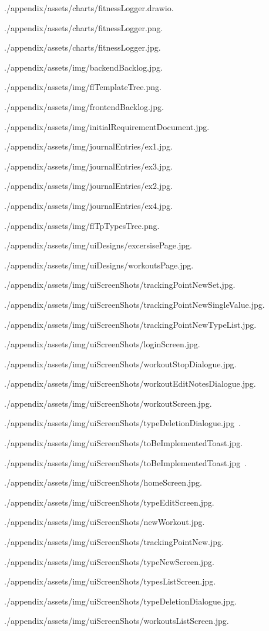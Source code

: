 \item ./appendix/assets/charts/fitnessLogger.drawio.  
\item ./appendix/assets/charts/fitnessLogger.png.  
\item ./appendix/assets/charts/fitnessLogger.jpg.  
\item ./appendix/assets/img/backendBacklog.jpg.  
\item ./appendix/assets/img/flTemplateTree.png.  
\item ./appendix/assets/img/frontendBacklog.jpg.  
\item ./appendix/assets/img/initialRequirementDocument.jpg.  
\item ./appendix/assets/img/journalEntries/ex1.jpg.  
\item ./appendix/assets/img/journalEntries/ex3.jpg.  
\item ./appendix/assets/img/journalEntries/ex2.jpg.  
\item ./appendix/assets/img/journalEntries/ex4.jpg.  
\item ./appendix/assets/img/flTpTypesTree.png.  
\item ./appendix/assets/img/uiDesigns/excersisePage.jpg.  
\item ./appendix/assets/img/uiDesigns/workoutsPage.jpg.  
\item ./appendix/assets/img/uiScreenShots/trackingPointNewSet.jpg.  
\item ./appendix/assets/img/uiScreenShots/trackingPointNewSingleValue.jpg.  
\item ./appendix/assets/img/uiScreenShots/trackingPointNewTypeList.jpg.  
\item ./appendix/assets/img/uiScreenShots/loginScreen.jpg.  
\item ./appendix/assets/img/uiScreenShots/workoutStopDialogue.jpg.  
\item ./appendix/assets/img/uiScreenShots/workoutEditNotesDialogue.jpg.  
\item ./appendix/assets/img/uiScreenShots/workoutScreen.jpg.  
\item ./appendix/assets/img/uiScreenShots/typeDeletionDialogue.jpg~.  
\item ./appendix/assets/img/uiScreenShots/toBeImplementedToast.jpg.  
\item ./appendix/assets/img/uiScreenShots/toBeImplementedToast.jpg~.  
\item ./appendix/assets/img/uiScreenShots/homeScreen.jpg.  
\item ./appendix/assets/img/uiScreenShots/typeEditScreen.jpg.  
\item ./appendix/assets/img/uiScreenShots/newWorkout.jpg.  
\item ./appendix/assets/img/uiScreenShots/trackingPointNew.jpg.  
\item ./appendix/assets/img/uiScreenShots/typeNewScreen.jpg.  
\item ./appendix/assets/img/uiScreenShots/typesListScreen.jpg.  
\item ./appendix/assets/img/uiScreenShots/typeDeletionDialogue.jpg.  
\item ./appendix/assets/img/uiScreenShots/workoutsListScreen.jpg.  
